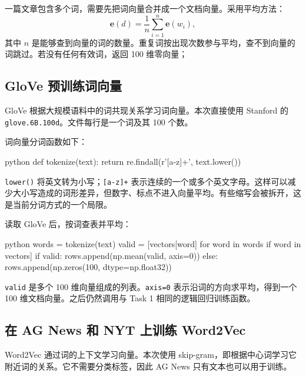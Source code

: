 \documentclass[12pt, a4paper, fontset=fandol]{ctexart}
\begin{document}
一篇文章包含多个词，需要先把词向量合并成一个文档向量。采用平均方法：
\begin{equation}
\boldsymbol{e}(d)=\frac{1}{n}\sum_{i=1}^{n}\boldsymbol{e}(w_i),
\end{equation}
其中 $n$ 是能够查到向量的词的数量。重复词按出现次数参与平均，查不到向量的词跳过。若没有任何有效词，返回 100 维零向量；


\subsection{GloVe 预训练词向量}
GloVe 根据大规模语料中的词共现关系学习词向量。本次直接使用 Stanford 的 \texttt{glove.6B.100d}。文件每行是一个词及其 100 个数。

词向量分词函数如下：
\begin{mycode}{python}
def tokenize(text):
    return re.findall(r'[a-z]+', text.lower())
\end{mycode}
\texttt{lower()} 将英文转为小写；\texttt{[a-z]+} 表示连续的一个或多个英文字母。这样可以减少大小写造成的词形差异，但数字、标点不进入向量平均。有些缩写会被拆开，这是当前分词方式的一个局限。

读取 GloVe 后，按词查表并平均：
\begin{mycode}{python}
words = tokenize(text)
valid = [vectors[word] for word in words if word in vectors]
if valid:
    rows.append(np.mean(valid, axis=0))
else:
    rows.append(np.zeros(100, dtype=np.float32))
\end{mycode}
\texttt{valid} 是多个 100 维向量组成的列表。\texttt{axis=0} 表示沿词的方向求平均，得到一个 100 维文档向量。之后仍然调用与 Task 1 相同的逻辑回归训练函数。

\subsection{在 AG News 和 NYT 上训练 Word2Vec}
Word2Vec 通过词的上下文学习向量。本次使用 skip-gram，即根据中心词学习它附近词的关系。它不需要分类标签，因此 AG News 只有文本也可以用于训练。
\end{document}

